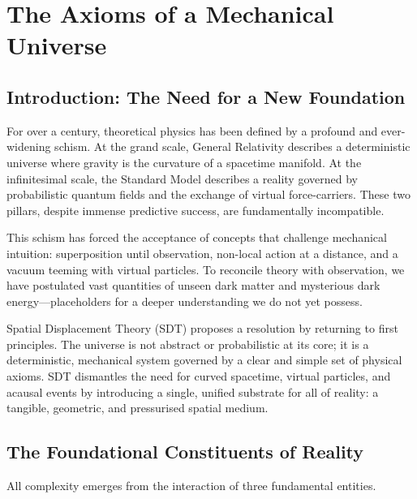 \chapter{The Axioms of a Mechanical Universe}

\author{James Tyndall}

\section{Introduction: The Need for a New Foundation}

For over a century, theoretical physics has been defined by a profound and ever-widening schism.  At the grand scale, General Relativity describes a deterministic universe where gravity is the curvature of a spacetime manifold.  At the infinitesimal scale, the Standard Model describes a reality governed by probabilistic quantum fields and the exchange of virtual force-carriers.  These two pillars, despite immense predictive success, are fundamentally incompatible.

This schism has forced the acceptance of concepts that challenge mechanical intuition: superposition until observation, non-local action at a distance, and a vacuum teeming with virtual particles.  To reconcile theory with observation, we have postulated vast quantities of unseen dark matter and mysterious dark energy---placeholders for a deeper understanding we do not yet possess.

Spatial Displacement Theory (SDT) proposes a resolution by returning to first principles.  The universe is not abstract or probabilistic at its core; it is a deterministic, mechanical system governed by a clear and simple set of physical axioms.  SDT dismantles the need for curved spacetime, virtual particles, and acausal events by introducing a single, unified substrate for all of reality: a tangible, geometric, and pressurised spatial medium.


\section{The Foundational Constituents of Reality}

All complexity emerges from the interaction of three fundamental entities.

